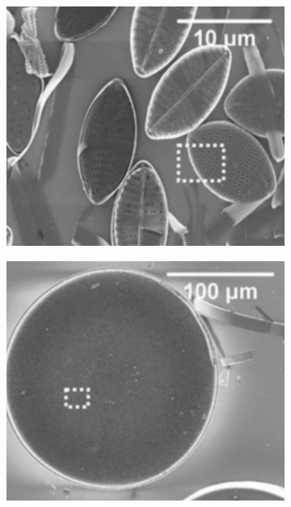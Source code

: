 \documentclass[letterpaper,12pt,oneside]{book}
\begin{document}
\begin{figure}[H] 
  \begin{subfigure}[b]{0.5\linewidth}
    \centering
    \includegraphics[width=0.75\linewidth]{Frustrulespictures/Screen Shot 2023-07-02 at 8.24.59 PM.png} 
    \subcaption[]{}
    \label{fig7:a} 
    \vspace{4ex}
  \end{subfigure}%
  \begin{subfigure}[b]{0.5\linewidth}
    \centering
    \includegraphics[width=0.75\linewidth]{Frustrulespictures/Screen Shot 2023-07-02 at 8.25.32 PM.png} 
    \subcaption[]{}
    \label{fig7:b} 
    \vspace{4ex}
  \end{subfigure} 
  \begin{subfigure}[b]{0.5\linewidth}
    \centering

\end{subfigure}
\end{figure}
\end{document}
